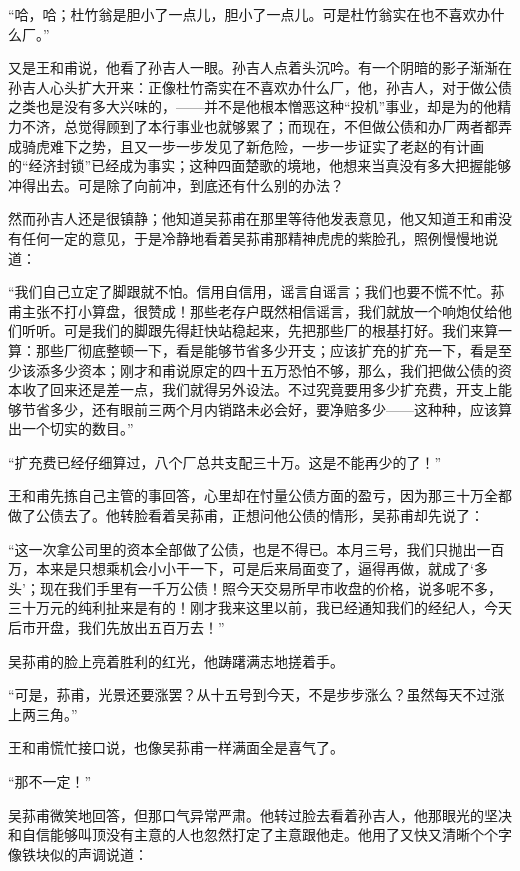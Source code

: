 \par “哈，哈；杜竹翁是胆小了一点儿，胆小了一点儿。可是杜竹翁实在也不喜欢办什么厂。”
\par 又是王和甫说，他看了孙吉人一眼。孙吉人点着头沉吟。有一个阴暗的影子渐渐在孙吉人心头扩大开来：正像杜竹斋实在不喜欢办什么厂，他，孙吉人，对于做公债之类也是没有多大兴味的，——并不是他根本憎恶这种“投机”事业，却是为的他精力不济，总觉得顾到了本行事业也就够累了；而现在，不但做公债和办厂两者都弄成骑虎难下之势，且又一步一步发见了新危险，一步一步证实了老赵的有计画的“经济封锁”已经成为事实；这种四面楚歌的境地，他想来当真没有多大把握能够冲得出去。可是除了向前冲，到底还有什么别的办法？
\par 然而孙吉人还是很镇静；他知道吴荪甫在那里等待他发表意见，他又知道王和甫没有任何一定的意见，于是冷静地看着吴荪甫那精神虎虎的紫脸孔，照例慢慢地说道：
\par “我们自己立定了脚跟就不怕。信用自信用，谣言自谣言；我们也要不慌不忙。荪甫主张不打小算盘，很赞成！那些老存户既然相信谣言，我们就放一个响炮仗给他们听听。可是我们的脚跟先得赶快站稳起来，先把那些厂的根基打好。我们来算一算：那些厂彻底整顿一下，看是能够节省多少开支；应该扩充的扩充一下，看是至少该添多少资本；刚才和甫说原定的四十五万恐怕不够，那么，我们把做公债的资本收了回来还是差一点，我们就得另外设法。不过究竟要用多少扩充费，开支上能够节省多少，还有眼前三两个月内销路未必会好，要净赔多少——这种种，应该算出一个切实的数目。”
\par “扩充费已经仔细算过，八个厂总共支配三十万。这是不能再少的了！”
\par 王和甫先拣自己主管的事回答，心里却在忖量公债方面的盈亏，因为那三十万全都做了公债去了。他转脸看着吴荪甫，正想问他公债的情形，吴荪甫却先说了：
\par “这一次拿公司里的资本全部做了公债，也是不得已。本月三号，我们只抛出一百万，本来是只想乘机会小小干一下，可是后来局面变了，逼得再做，就成了‘多头’；现在我们手里有一千万公债！照今天交易所早市收盘的价格，说多呢不多，三十万元的纯利扯来是有的！刚才我来这里以前，我已经通知我们的经纪人，今天后市开盘，我们先放出五百万去！”
\par 吴荪甫的脸上亮着胜利的红光，他踌躇满志地搓着手。
\par “可是，荪甫，光景还要涨罢？从十五号到今天，不是步步涨么？虽然每天不过涨上两三角。”
\par 王和甫慌忙接口说，也像吴荪甫一样满面全是喜气了。
\par “那不一定！”
\par 吴荪甫微笑地回答，但那口气异常严肃。他转过脸去看着孙吉人，他那眼光的坚决和自信能够叫顶没有主意的人也忽然打定了主意跟他走。他用了又快又清晰个个字像铁块似的声调说道：
